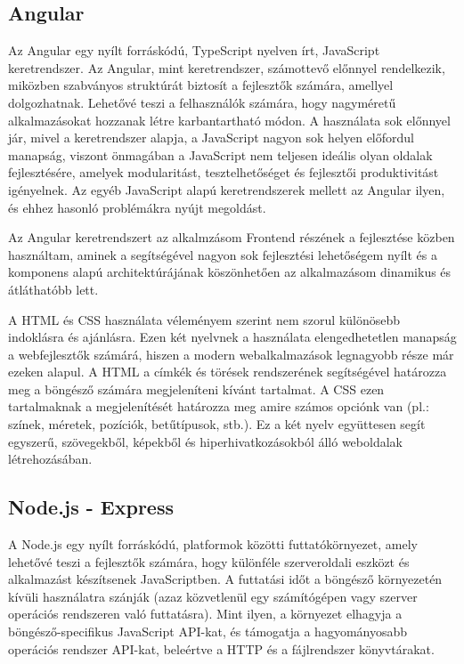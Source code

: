 
\subsection{Angular}
Az Angular \cite{Angular1} egy nyílt forráskódú, TypeScript \cite{TypeScript} nyelven írt, JavaScript keretrendszer. Az Angular, mint keretrendszer, számottevő előnnyel rendelkezik, miközben szabványos struktúrát biztosít a fejlesztők számára, amellyel dolgozhatnak. Lehetővé teszi a felhasználók számára, hogy nagyméretű alkalmazásokat hozzanak létre karbantartható módon. A használata sok előnnyel jár, mivel a keretrendszer alapja, a JavaScript nagyon sok helyen előfordul manapság, viszont önmagában a JavaScript nem teljesen ideális olyan oldalak fejlesztésére, amelyek modularitást, tesztelhetőséget és fejlesztői produktivitást igényelnek. Az egyéb JavaScript alapú keretrendszerek mellett az Angular ilyen, és ehhez hasonló problémákra nyújt megoldást.

Az Angular keretrendszert az alkalmzásom Frontend részének a fejlesztése közben használtam, aminek a segítségével nagyon sok fejlesztési lehetőségem nyílt és a komponens alapú architektúrájának köszönhetően az alkalmazásom dinamikus és átláthatóbb lett.
\cite{Angular}\newline 

A HTML és CSS használata véleményem szerint nem szorul különösebb indoklásra és ajánlásra. Ezen két nyelvnek a használata elengedhetetlen manapság a webfejlesztők számárá, hiszen a modern webalkalmazások legnagyobb része már ezeken alapul. A HTML a címkék és törések rendszerének segítségével határozza meg a böngésző számára megjeleníteni kívánt tartalmat. A CSS ezen tartalmaknak a megjelenítését határozza meg amire számos opciónk van (pl.: színek, méretek, pozíciók, betűtípusok, stb.). Ez a két nyelv együttesen segít egyszerű, szövegekből, képekből és hiperhivatkozásokból álló weboldalak létrehozásában.
\cite{HTML}

\subsection{Node.js - Express}
A Node.js egy nyílt forráskódú, platformok közötti futtatókörnyezet, amely lehetővé teszi a fejlesztők számára, hogy különféle szerveroldali eszközt és alkalmazást készítsenek JavaScriptben. A futtatási időt a böngésző környezetén kívüli használatra szánják (azaz közvetlenül egy számítógépen vagy szerver operációs rendszeren való futtatásra). Mint ilyen, a környezet elhagyja a böngésző-specifikus JavaScript API-kat, és támogatja a hagyományosabb operációs rendszer API-kat, beleértve a HTTP és a fájlrendszer könyvtárakat.
 
